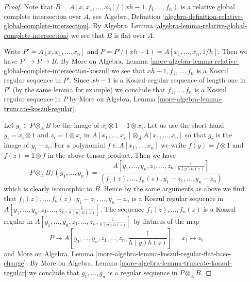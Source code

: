 \documentclass{stacks-project}
\theoremstyle{plain}
\theoremstyle{definition}
\theoremstyle{remark}
\numberwithin{equation}{subsection}
\begin{document}
\begin{proof}
Note that
$B = A[x, x_1, \ldots, x_n]/(xh - 1, f_1, \ldots, f_n)$
is a relative global complete intersection over $A$, see
Algebra, Definition
\ref{algebra-definition-relative-global-complete-intersection}.
By Algebra, Lemma \ref{algebra-lemma-relative-global-complete-intersection}
we see that $B$ is flat over $A$.

\medskip\noindent
Write $P' = A[x, x_1, \ldots, x_n]$ and
$P = P'/(xh - 1) = A[x_1, \ldots, x_n, 1/h]$.
Then we have $P' \to P \to B$.
By More on Algebra, Lemma
\ref{more-algebra-lemma-relative-global-complete-intersection-koszul}
we see that $xh - 1, f_1, \ldots, f_n$ is a Koszul regular sequence
in $P'$. Since $xh - 1$ is a Koszul regular sequence of length
one in $P'$ (by the same lemma for example) we conclude that 
$f_1, \ldots, f_n$ is a Koszul regular sequence in $P$ by
More on Algebra, Lemma \ref{more-algebra-lemma-truncate-koszul-regular}.

\medskip\noindent
Let $g_i \in P \otimes_A B$ be the image of $x_i \otimes 1 - 1 \otimes x_i$.
Let us use the short hand $y_i = x_i \otimes 1$ and $z_i = 1 \otimes x_i$
in $A[x_1, \ldots, x_n] \otimes_A A[x_1, \ldots, x_n]$
so that $g_i$ is the image of $y_i - z_i$. For a polynomial
$f \in A[x_1, \ldots, x_n]$ we write $f(y) = f \otimes 1$
and $f(z) = 1 \otimes f$ in the above tensor product.
Then we have
$$
P \otimes_A B/(g_1, \ldots, g_n) =
\frac{A[y_1, \ldots, y_n, z_1, \ldots, z_n, \frac{1}{h(y)h(z)}]}
{(f_1(z), \ldots, f_n(z), y_1 - z_1, \ldots, y_n - z_n)}
$$
which is clearly isomorphic to $B$. Hence by the same arguments
as above we find that $f_1(z), \ldots, f_n(z), y_1 - z_1, \ldots, y_n - z_n$
is a Koszul regular sequence in
$A[y_1, \ldots, y_n, z_1, \ldots, z_n, \frac{1}{h(y)h(z)}]$.
The sequence $f_1(z), \ldots, f_n(z)$ is a Koszul regular in
$A[y_1, \ldots, y_n, z_1, \ldots, z_n, \frac{1}{h(y)h(z)}]$
by flatness of the map
$$
P \longrightarrow A[y_1, \ldots, y_n, z_1, \ldots, z_n,
\textstyle{\frac{1}{h(y)h(z)}}],\quad x_i \longmapsto z_i
$$
and More on Algebra, Lemma
\ref{more-algebra-lemma-koszul-regular-flat-base-change}.
By More on Algebra, Lemma \ref{more-algebra-lemma-truncate-koszul-regular}
we conclude that $g_1, \ldots, g_n$ is a regular sequence
in $P \otimes_A B$.


\end{proof}
\end{document}
